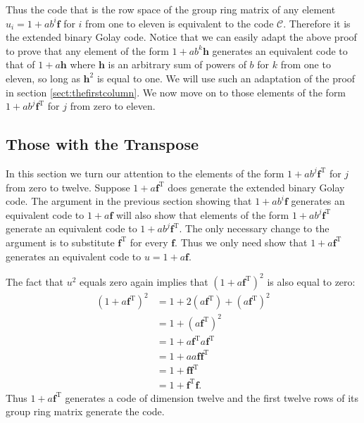 Thus the code that is the row space of the group ring matrix of any element $u_i = 1 + a b^i \mathbf{f}$ for $i$ from one to eleven is equivalent to the code $\mathcal{C}$.
Therefore it is the extended binary Golay code.
Notice that we can easily adapt the above proof to prove that any element of the form $1+ab^k \mathbf{h}$ generates an equivalent code to that of $1+a \mathbf{h}$ where $\mathbf{h}$ is an arbitrary sum of powers of $b$ for $k$ from one to eleven, so long as $\mathbf{h}^2$ is equal to one.
We will use such an adaptation of the proof in section \ref{sect:thefirstcolumn}.
We now move on to those elements of the form $1 + a b^j \mathbf{f}^{\textrm{T}}$ for $j$ from zero to eleven.

\subsection{Those with the Transpose}
In this section we turn our attention to the elements of the form $1+ a b^j \mathbf{f}^{\textrm{T}}$ for $j$ from zero to twelve.
Suppose $1 + a \mathbf{f}^{\textrm{T}}$ does generate the extended binary Golay code.
The argument in the previous section showing that $1 + a b^i \mathbf{f}$ generates an equivalent code to $1 + a \mathbf{f}$ will also show that elements of the form $1 + a b^j \mathbf{f}^{\textrm{T}}$ generate an equivalent code to $1 + a b^j \mathbf{f}^{\textrm{T}}$.
The only necessary change to the argument is to substitute $\mathbf{f}^{\textrm{T}}$ for every $\mathbf{f}$.
Thus we only need show that $1 + a \mathbf{f}^{\textrm{T}}$ generates an equivalent code to $u=1 + a \mathbf{f}$.

The fact that $u^2$ equals zero again implies that $(1 + a \mathbf{f}^{\textrm{T}})^2$ is also equal to zero:
\begin{align*}
(1+ a \mathbf{f}^{\textrm{T}})^2 
&= 1 + 2 ( a \mathbf{f}^{\textrm{T}} ) + ( a \mathbf{f}^{\textrm{T}})^2 \\
&= 1 + ( a \mathbf{f}^{\textrm{T}})^2 \\
&= 1 +  a \mathbf{f}^{\textrm{T}} a \mathbf{f}^{\textrm{T}} \\
&= 1 +  a a \mathbf{f} \mathbf{f}^{\textrm{T}} \\
&= 1 +  \mathbf{f} \mathbf{f}^{\textrm{T}} \\
&= 1 +  \mathbf{f}^{\textrm{T}} \mathbf{f}.
\end{align*}
Thus $1 + a \mathbf{f}^{\textrm{T}}$ generates a code of dimension twelve and the first twelve rows of its group ring matrix generate the code.

